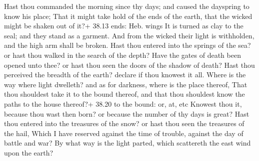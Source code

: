  Hast thou commanded the morning since thy days; and caused
the dayspring to know his place;  That it might take hold
of the ends of the earth, that the wicked might be shaken out of it?+
38.13 ends: Heb. wings  It is turned as clay to the seal;
and they stand as a garment.  And from the wicked their
light is withholden, and the high arm shall be broken. 
Hast thou entered into the springs of the sea? or hast thou walked in
the search of the depth?  Have the gates of death been
opened unto thee? or hast thou seen the doors of the shadow of death?
 Hast thou perceived the breadth of the earth? declare if
thou knowest it all.  Where is the way where light
dwelleth? and as for darkness, where is the place thereof, 
That thou shouldest take it to the bound thereof, and that thou
shouldest know the paths to the house thereof?+ 38.20 to the bound: or,
at, etc  Knowest thou it, because thou wast then born? or
because the number of thy days is great?  Hast thou entered
into the treasures of the snow? or hast thou seen the treasures of the
hail,  Which I have reserved against the time of trouble,
against the day of battle and war?  By what way is the
light parted, which scattereth the east wind upon the earth?


